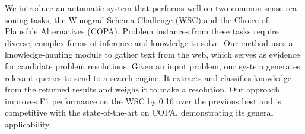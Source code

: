 We  introduce  an  automatic  system  that performs well on two common-sense rea- soning tasks, the Winograd Schema Challenge (WSC) and the Choice of Plausible Alternatives  (COPA).  Problem  instances from  these  tasks  require  diverse,   complex  forms  of  inference  and  knowledge to solve.  Our method uses a knowledge-hunting  module  to  gather  text  from  the web,  which  serves  as  evidence  for  candidate problem resolutions.  Given an input  problem,  our  system  generates  relevant  queries  to  send  to  a  search  engine. It extracts and classifies knowledge from the returned results and weighs it to make a  resolution.   Our  approach  improves  F1 performance on the WSC by 0.16 over the previous best and is competitive with the state-of-the-art  on  COPA,  demonstrating its general applicability.
